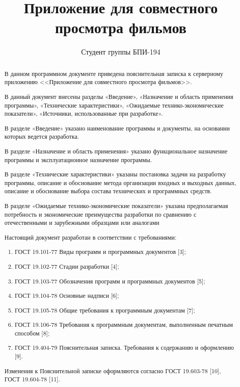 \documentclass{../includes/TechDoc}
\title{Приложение для совместного просмотра фильмов}
\author{Студент группы БПИ-194}{В. А. Анненков}
\begin{document}
    \maketitle

    \begin{abstract}
        В данном программном документе приведена пояснительная записка к серверному приложению <<Приложение для совместного просмотра фильмов>>.

        В данный документ внесены разделы «Введение», «Назначение и область применения программы», «Технические характеристики», «Ожидаемые технико-экономические показатели», «Источники, использованные при разработке».

        В разделе «Введение» указано наименование программы и документы, на основании которых ведется разработка.

        В разделе «Назначение и область применения» указано функциональное назначение программы и эксплуатационное назначение программы.

        В разделе «Технические характеристики» указаны постановка задачи на разработку программы, описание и обоснование метода организации входных и выходных данных, описание и обоснование выбора состава технических и программных средств.

        В разделе «Ожидаемые технико-экономические показатели» указана предполагаемая потребность и экономические преимущества разработки по сравнению с отечественными и зарубежными образцами или аналогами

        Настоящий документ разработан в соответствии с требованиями:
        \begin{enumerate}
            \item ГОСТ 19.101-77 Виды программ и программных документов [3];
            \item ГОСТ 19.102-77 Стадии разработки [4];
            \item ГОСТ 19.103-77 Обозначения программ и программных документов [5];
            \item ГОСТ 19.104-78 Основные надписи [6];
            \item ГОСТ 19.105-78 Общие требования к программным документам [7];
            \item ГОСТ 19.106-78 Требования к программным документам, выполненным печатным способом [8];
            \item ГОСТ 19.404-79 Пояснительная записка.
            Требования к содержанию и оформлению [9].
        \end{enumerate}
        Изменения к Пояснительной записке оформляются согласно ГОСТ 19.603-78 [10], ГОСТ 19.604-78 [11].
    \end{abstract}
\end{document}
